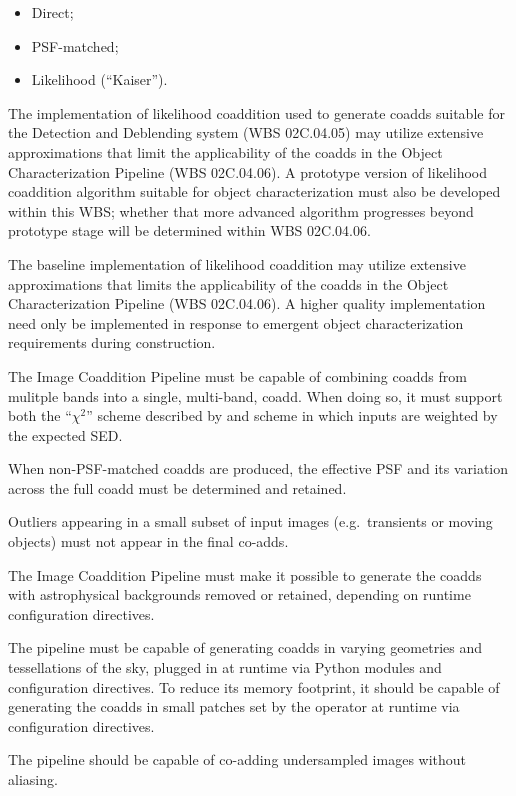 \documentclass[12pt]{article}
\newcommand{\wbsDetDeblend}{WBS 02C.04.05}
\newcommand{\wbsObjChar}{WBS 02C.04.06}
\begin{document}
\begin{itemize}
    \item{Direct;}
    \item{PSF-matched;}
    \item{Likelihood (``Kaiser'').}
\end{itemize}

The implementation of likelihood coaddition used to generate coadds suitable for the Detection and Deblending system (\wbsDetDeblend{}) may utilize extensive approximations that limit the applicability of the coadds in the Object Characterization Pipeline (\wbsObjChar{}). A prototype version of likelihood coaddition algorithm suitable for object characterization must also be developed within this WBS; whether that more advanced algorithm progresses beyond prototype stage will be determined within \wbsObjChar{}.

The baseline implementation of likelihood coaddition may utilize extensive approximations that limits the applicability of the coadds in the Object Characterization Pipeline (\wbsObjChar). A higher quality implementation need only be implemented in response to emergent object characterization requirements during construction.

The Image Coaddition Pipeline must be capable of combining coadds from mulitple bands into a single, multi-band, coadd. When doing so, it must support both the ``$\chi^2$'' scheme described by \cite{Szalay99} and scheme in which inputs are weighted by the expected SED.

When non-PSF-matched coadds are produced, the effective PSF and its variation across the full coadd must be determined and retained.

Outliers appearing in a small subset of input images (e.g.\ transients or moving objects) must not appear in the final co-adds. %

The Image Coaddition Pipeline must make it possible to generate the coadds with astrophysical backgrounds removed or retained, depending on runtime configuration directives.

The pipeline must be capable of generating coadds in varying geometries and tessellations of the sky, plugged in at runtime via Python modules and configuration directives. To reduce its memory footprint, it should be capable of generating the coadds in small patches set by the operator at runtime via configuration directives.

The pipeline should be capable of co-adding undersampled images without aliasing.
\end{document}
